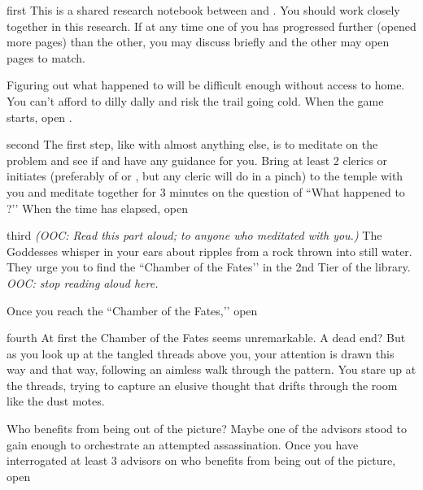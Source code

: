\documentclass[notebook]{GL2020} %
\begin{document}
\startnotebook{\nFindAssassin{}}

\begin{page}{first}
This is a shared research notebook between \cJuniorStatesman{} and \cPresident{}. You should work closely together in this research. If at any time one of you has progressed further (opened more pages) than the other, you may discuss briefly and the other may open pages to match.

Figuring out what happened to \cHeadDiplomat{} will be difficult enough without access to \cHeadDiplomat{\their} home. You can’t afford to dilly dally and risk the trail going cold. When the game starts, open .
\end{page}

\begin{page}{second}
The first step, like with almost anything else, is to meditate on the problem and see if \cEbb{} and \cFlow{} have any guidance for you. Bring at least 2 clerics or initiates (preferably of \cEbb{} or \cFlow{}, but any cleric will do in a pinch) to the temple with you and meditate together for 3 minutes on the question of ``What happened to \cHeadDiplomat{}?’’ When the time has elapsed, open 
\end{page}

\begin{page}{third}
\emph{(OOC: Read this part aloud; to anyone who meditated with you.)} The Goddesses whisper in your ears about ripples from a rock thrown into still water. They urge you to find the ``Chamber of the Fates’’ in the 2nd Tier of the library. \emph{OOC: stop reading aloud here.}

Once you reach the ``Chamber of the Fates,’’ open 
\end{page}

\begin{page}{fourth}
At first the Chamber of the Fates seems unremarkable. A dead end? But as you look up at the tangled threads above you, your attention is drawn this way and that way, following an aimless walk through the pattern. You stare up at the threads, trying to capture an elusive thought that drifts through the room like the dust motes.

Who benefits from \cHeadDiplomat{} being out of the picture? Maybe one of the advisors stood to gain enough to orchestrate an attempted assassination. Once you have interrogated at least 3 advisors on who benefits from \cHeadDiplomat{} being out of the picture, open 
\end{page}
\end{document}
